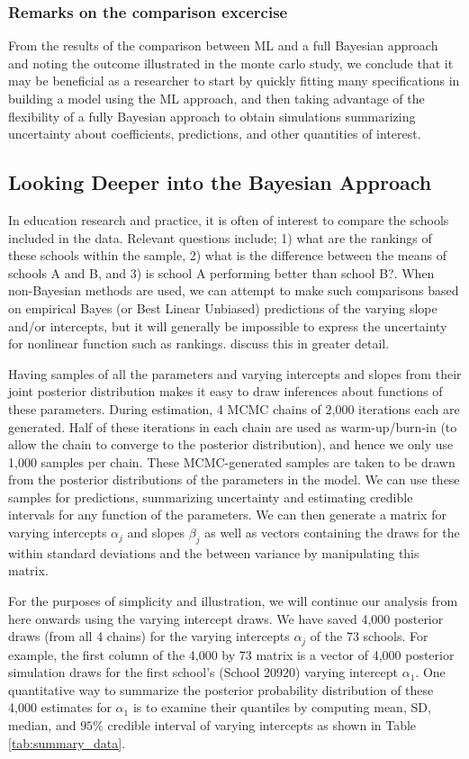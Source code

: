 \subsubsection*{Remarks on the comparison excercise}
From the results of the comparison between ML and a full Bayesian approach and noting the outcome illustrated in the monte carlo study, we conclude that it may be beneficial as a researcher to start by quickly fitting many specifications in building a model using the ML approach, and then taking advantage of the flexibility of a fully Bayesian approach to obtain simulations summarizing uncertainty about coefficients, predictions, and other quantities of interest.

\subsection{Looking Deeper into the Bayesian Approach}
\label{subsection:Deeper}
In education research and practice, it is often of interest to compare the schools included in the data. Relevant questions include; 1) what are the rankings of these schools within the sample, 2) what is the difference between the means of schools A and B, and 3) is school A performing better than school B?. When non-Bayesian methods are used, we can attempt to make such comparisons based on empirical Bayes (or Best Linear Unbiased) predictions of the varying slope and/or intercepts, but it will generally be impossible to express the uncertainty for nonlinear function such as rankings. \cite{goldstein1996league} discuss this in greater detail.

Having samples of all the parameters and varying intercepts and slopes from their joint posterior distribution makes it easy to draw inferences about functions of these parameters.
During estimation, 4 MCMC chains of 2,000 iterations each are generated. Half of these iterations in each chain are used as warm-up/burn-in (to allow the chain to converge to the posterior distribution), and hence we only use 1,000 samples per chain. These MCMC-generated samples are taken to be drawn from the posterior distributions of the parameters in the model. We can use these samples for predictions, summarizing uncertainty and estimating credible intervals for any function of the parameters.
We can then generate a matrix for varying intercepts $\alpha_j$ and slopes $\beta_j$ as well as vectors containing the draws for the within standard deviations and the between variance by manipulating this matrix.

For the purposes of simplicity and illustration, we will continue our analysis from here onwards using the varying intercept draws. We have saved 4,000 posterior draws (from all 4 chains) for the varying intercepts $\alpha_{j}$ of the 73 schools. For example, the first column of the 4,000 by 73 matrix is a vector of 4,000 posterior simulation draws for the first school's (School 20920) varying intercept $\alpha_{1}$.  One quantitative way to summarize the posterior probability distribution of these 4,000 estimates for $\alpha_{1}$ is to examine their quantiles by computing mean, SD, median, and $95\%$ credible interval of varying intercepts as shown in Table \ref{tab:summary_data}.

